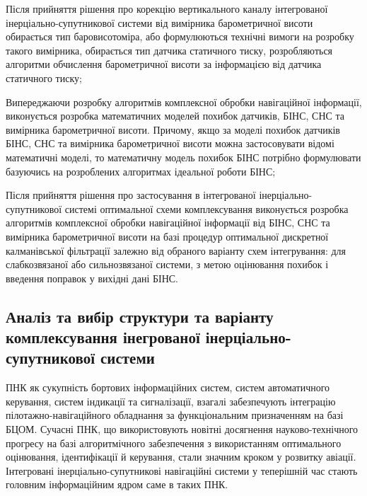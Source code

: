 Після прийняття рішення про корекцію вертикального каналу інтегрованої 
інерціально-супутникової системи від вимірника барометричної висоти обирається 
тип баровисотоміра, або формулюються технічні вимоги на розробку такого 
вимірника, обирається тип датчика статичного тиску, розробляються алгоритми 
обчислення барометричної висоти за інформацією від датчика статичного тиску;

Випереджаючи розробку алгоритмів комплексної обробки навігаційної 
інформації, виконується розробка математичних моделей похибок датчиків, 
БІНС, СНС та вимірника барометричної висоти. Причому, якщо за моделі 
похибок датчиків БІНС, СНС та вимірника барометричної висоти можна 
застосовувати відомі математичні моделі, то математичну модель похибок 
БІНС потрібно формулювати базуючись на розроблених алгоритмах ідеальної 
роботи БІНС;

Після прийняття рішення про застосування в інтегрованої інерціально-супутникової 
системі оптимальної схеми комплексування виконується розробка алгоритмів 
комплексної обробки навігаційної інформації від БІНС, СНС та вимірника 
барометричної висоти на базі процедур оптимальної дискретної калманівської 
фільтрації залежно від обраного варіанту схем інтегрування: для слабкозвязаної 
або сильнозвязаної системи, з метою оцінювання похибок і введення поправок у 
вихідні дані БІНС.
% 
% 

\subsection{Аналіз та вибір структури та варіанту комплексування інегрованої
інерціально-супутникової системи}

ПНК як сукупність бортових інформаційних систем, систем автоматичного керування, 
систем індикації та сигналізації, взагалі забезпечують інтеграцію пілотажно-навігаційного 
обладнання за функціональним призначенням на базі  БЦОМ. Сучасні ПНК, що використовують  
новітні досягнення науково-технічного прогресу на базі алгоритмічного забезпечення з 
використанням оптимального оцінювання, ідентифікації й керування, стали значним кроком 
у розвитку авіації. Інтегровані  інерціально-супутникові навігаційні системи у 
теперішній час стають головним інформаційним ядром саме в таких ПНК. 

